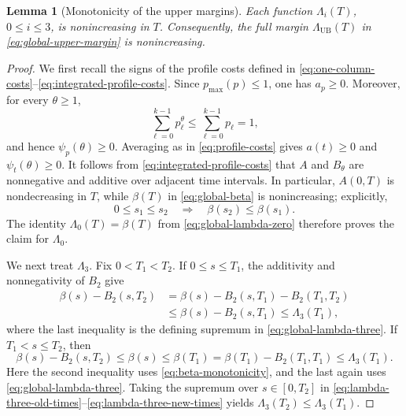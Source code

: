 \documentclass[11pt]{article}
\numberwithin{equation}{section}
\newtheorem{lemma}[lemma]{Lemma}
\newcommand{\1}{\mathbf 1}
\newcommand{\UB}{\mathrm{UB}}
\begin{document}
\begin{lemma}[Monotonicity of the upper margins]
\label{lem:upper-margin-monotonicity}
Each function $\Lambda_i(T)$, $0\le i\le3$, is nonincreasing in $T$.
Consequently, the full margin $\Lambda_{\UB}(T)$ in
\eqref{eq:global-upper-margin} is nonincreasing.
\end{lemma}

\begin{proof}
We first recall the signs of the profile costs defined in
\eqref{eq:one-column-costs}--\eqref{eq:integrated-profile-costs}.  Since
$p_{\max}(p)\le1$, one has $a_p\ge0$.  Moreover, for every $\theta\ge1$,
\[
  \sum_{\ell=0}^{k-1}p_\ell^\theta
  \le\sum_{\ell=0}^{k-1}p_\ell=1,
\]
and hence $\psi_p(\theta)\ge0$.  Averaging as in
\eqref{eq:profile-costs} gives $a(t)\ge0$ and
$\psi_t(\theta)\ge0$.  It follows from
\eqref{eq:integrated-profile-costs} that $A$ and $B_\theta$ are
nonnegative and additive over adjacent time intervals.  In particular,
$A(0,T)$ is nondecreasing in $T$, while $\beta(T)$ in
\eqref{eq:global-beta} is nonincreasing; explicitly,
\begin{equation}
\label{eq:beta-monotonicity}
  0\le s_1\le s_2
  \quad\Longrightarrow\quad
  \beta(s_2)\le\beta(s_1).
\end{equation}
The identity
$\Lambda_0(T)=\beta(T)$ from \eqref{eq:global-lambda-zero} therefore proves
the claim for $\Lambda_0$.

We next treat $\Lambda_3$.  Fix $0<T_1<T_2$.  If $0\le s\le T_1$, the
additivity and nonnegativity of $B_2$ give
\begin{align}
  \beta(s)-B_2(s,T_2)
  &=\beta(s)-B_2(s,T_1)-B_2(T_1,T_2)\nonumber\\
  &\le\beta(s)-B_2(s,T_1)
  \le\Lambda_3(T_1),
  \label{eq:lambda-three-old-times}
\end{align}
where the last inequality is the defining supremum in
\eqref{eq:global-lambda-three}.  If $T_1<s\le T_2$, then
\begin{equation}
\label{eq:lambda-three-new-times}
  \beta(s)-B_2(s,T_2)
  \le\beta(s)
  \le\beta(T_1)
  =\beta(T_1)-B_2(T_1,T_1)
  \le\Lambda_3(T_1).
\end{equation}
Here the second inequality uses \eqref{eq:beta-monotonicity},
and the last again uses \eqref{eq:global-lambda-three}.  Taking the
supremum over $s\in[0,T_2]$ in
\eqref{eq:lambda-three-old-times}--\eqref{eq:lambda-three-new-times} yields
$\Lambda_3(T_2)\le\Lambda_3(T_1)$.


\end{proof}
\end{document}
